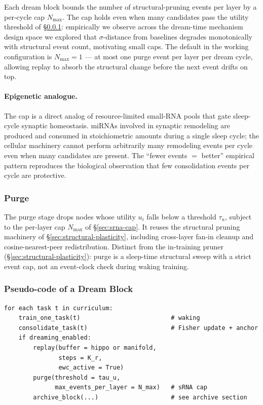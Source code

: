 \documentclass[11pt]{article}
\begin{document}
Each dream block bounds the number of structural-pruning events per
layer by a per-cycle cap $N_{\max}$. The cap holds even when many
candidates pass the utility threshold of \S\ref{sec:purge}: empirically
we observe across the dream-time mechanism design space we explored that
$\sigma$-distance from baselines degrades monotonically with structural
event count, motivating small caps. The default in the working
configuration is $N_{\max} = 1$ --- at most one purge event per layer
per dream cycle, allowing replay to absorb the structural change before
the next event drifts on top.

\paragraph{Epigenetic analogue.}
The cap is a direct analog of resource-limited small-RNA pools that gate
sleep-cycle synaptic homeostasis. miRNAs involved in synaptic remodeling
are produced and consumed in stoichiometric amounts during a single sleep
cycle; the cellular machinery cannot perform arbitrarily many remodeling
events per cycle even when many candidates are present. The ``fewer
events $=$ better'' empirical pattern reproduces the biological
observation that few consolidation events per cycle are protective.

\subsubsection{Purge}
\label{sec:purge}

The purge stage drops nodes whose utility $u_i$ falls below a threshold
$\tau_u$, subject to the per-layer cap $N_{\max}$ of
\S\ref{sec:srna-cap}. It reuses the structural pruning machinery of
\S\ref{sec:structural-plasticity}, including cross-layer fan-in cleanup
and cosine-nearest-peer redistribution. Distinct from the in-training
pruner (\S\ref{sec:structural-plasticity}): purge is a sleep-time
structural sweep with a strict event cap, not an event-clock check
during waking training.

\subsubsection{Pseudo-code of a Dream Block}
\label{sec:dream-pseudocode}

\begin{verbatim}
for each task t in curriculum:
    train_one_task(t)                         # waking
    consolidate_task(t)                       # Fisher update + anchor
    if dreaming_enabled:
        replay(buffer = hippo or manifold,
               steps = K_r,
               ewc_active = True)
        purge(threshold = tau_u,
              max_events_per_layer = N_max)   # sRNA cap
        archive_block(...)                    # see archive section
\end{verbatim}
\end{document}
